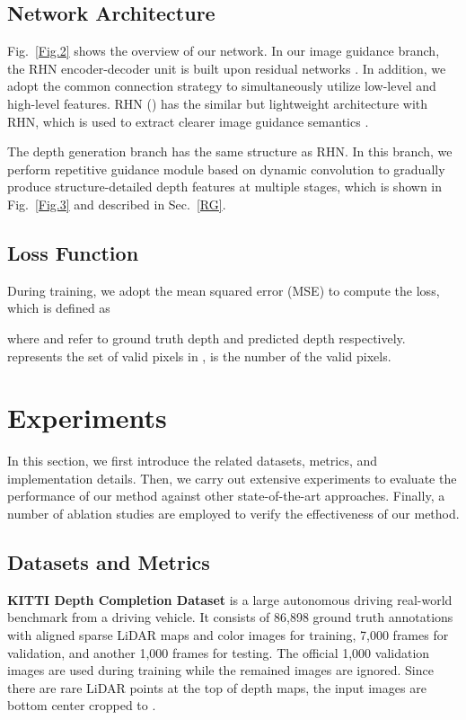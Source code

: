 \documentclass[runningheads]{llncs}
\begin{document}
\subsection{Network Architecture}
Fig.~\ref{Fig.2} shows the overview of our network. In our image guidance branch, the RHN encoder-decoder unit is built upon residual networks \cite{He2016Deep}. In addition, we adopt the common connection strategy \cite{ronneberger2015u,chen2019learning} to simultaneously utilize low-level and high-level features. RHN () has the similar but lightweight architecture with RHN, which is used to extract clearer image guidance semantics \cite{zeiler2014visualizing}. 

The depth generation branch has the same structure as RHN. In this branch, we perform repetitive guidance module based on dynamic convolution to gradually produce structure-detailed depth features at multiple stages, which is shown in Fig.~\ref{Fig.3} and described in Sec.~\ref{RG}. 

\subsection{Loss Function}
During training, we adopt the mean squared error (MSE) to compute the loss, which is defined as

where  and  refer to ground truth depth and predicted depth respectively.  represents the set of valid pixels in ,  is the number of the valid pixels.



\section{Experiments}
In this section, we first introduce the related datasets, metrics, and implementation details. Then, we carry out extensive experiments to evaluate the performance of our method against other state-of-the-art approaches. Finally, a number of ablation studies are employed to verify the effectiveness of our method.

\subsection{Datasets and Metrics}
\textbf{KITTI Depth Completion Dataset} \cite{Uhrig2017THREEDV} is a large autonomous driving real-world benchmark from a driving vehicle. It consists of 86,898 ground truth annotations with aligned sparse LiDAR maps and color images for training, 7,000 frames for validation, and another 1,000 frames for testing. The official 1,000 validation images are used during training while the remained images are ignored. Since there are rare LiDAR points at the top of depth maps, the input images are bottom center cropped \cite{vangansbeke2019,tang2020learning,zhao2021adaptive,liu2021fcfr} to .
\end{document}
